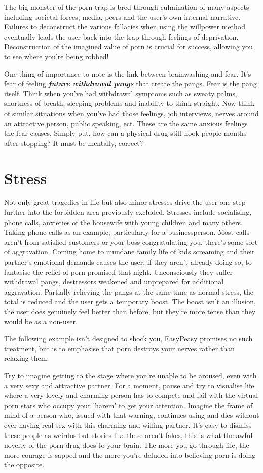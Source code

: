 \documentclass[easypeasy.tex]{subfiles}
\begin{document}
The big monster of the porn trap is bred through culmination of many aspects including societal forces, media, peers and the user's own internal narrative. Failures to deconstruct the various fallacies when using the willpower method eventually leads the user back into the trap through feelings of deprivation. Deconstruction of the imagined value of porn is crucial for success, allowing you to see where you're being robbed!

One thing of importance to note is the link between brainwashing and fear. It's fear of feeling \textit{\textbf{future withdrawal pangs}} that create the pangs. Fear is the pang itself. Think when you've had withdrawal symptoms such as sweaty palms, shortness of breath, sleeping problems and inability to think straight. Now think of similar situations when you've had those feelings, job interviews, nerves around an attractive person, public speaking, ect. These are the same anxious feelings the fear causes. Simply put, how can a physical drug still hook people months after stopping? It must be mentally, correct?

\section{Stress}

Not only great tragedies in life but also minor stresses drive the user one step further into the forbidden area previously excluded. Stresses include socialising, phone calls, anxieties of the housewife with young children and many others. Taking phone calls as an example, particularly for a businessperson. Most calls aren't from satisfied customers or your boss congratulating you, there's some sort of aggravation. Coming home to mundane family life of kids screaming and their partner's emotional demands causes the user, if they aren't already doing so, to fantasise the relief of porn promised that night. Unconsciously they suffer withdrawal pangs, destressors weakened and unprepared for additional aggravation. Partially relieving the pangs at the same time as normal stress, the total is reduced and the user gets a temporary boost. The boost isn't an illusion, the user does genuinely feel better than before, but they're more tense than they would be as a non-user.

The following example isn't designed to shock you, EasyPeasy promises no such treatment, but is to emphasise that porn destroys your nerves rather than relaxing them.

Try to imagine getting to the stage where you're unable to be aroused, even with a very sexy and attractive partner. For a moment, pause and try to visualise life where a very lovely and charming person has to compete and fail with the virtual porn stars who occupy your 'harem' to get your attention. Imagine the frame of mind of a person who, issued with that warning, continues using and dies without ever having real sex with this charming and willing partner. It's easy to dismiss these people as weirdos but stories like these aren't fakes, this is what the awful novelty of the porn drug does to your brain. The more you go through life, the more courage is sapped and the more you're deluded into believing porn is doing the opposite.
\end{document}
